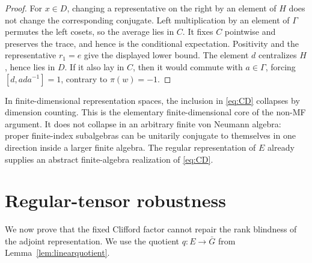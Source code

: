\documentclass[11pt]{article}
\theoremstyle{definition}
\theoremstyle{remark}
\begin{document}
\begin{proof}
For $x\in D$, changing a representative on the right by an element of $H$
does not change the corresponding conjugate.  Left multiplication by an
element of $\Gamma$ permutes the left cosets, so the average lies in $C$.
It fixes $C$ pointwise and preserves the trace, and hence is the conditional
expectation.  Positivity and the representative $r_1=e$ give the displayed
lower bound.  The element $d$ centralizes $H$, hence lies in $D$.  If it
also lay in $C$, then it would commute with $a\in\Gamma$, forcing
$[d,ada^{-1}]=1$, contrary to $\pi(w)=-1$.
\end{proof}

In finite-dimensional representation spaces, the inclusion in
\eqref{eq:CD} collapses by dimension counting.  This is the elementary
finite-dimensional core of the non-MF argument.  It does not collapse in an
arbitrary finite von Neumann algebra: proper finite-index subalgebras can be
unitarily conjugate to themselves in one direction inside a larger finite
algebra.  The regular representation of $E$ already supplies an abstract
finite-algebra realization of \eqref{eq:CD}.

\section{Regular-tensor robustness}\label{sec:dilution}

We now prove that the fixed Clifford factor cannot repair the rank blindness
of the adjoint representation.  We use the quotient
$q:E\to\bar G$ from Lemma~\ref{lem:linearquotient}.
\end{document}
